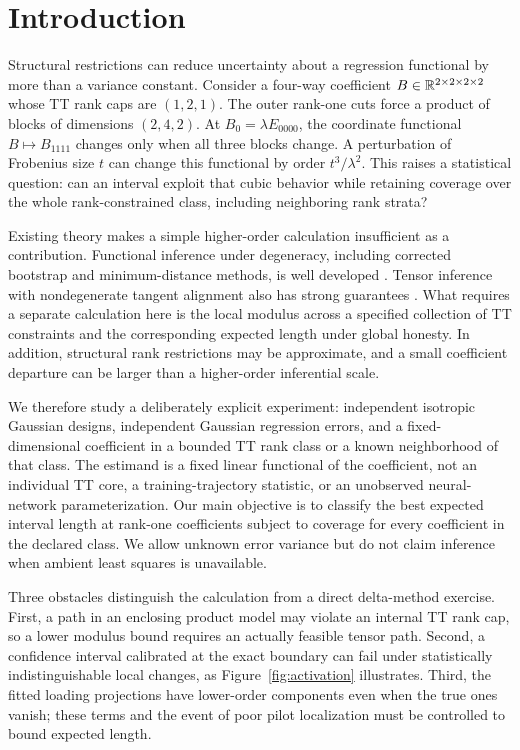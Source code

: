 \section{Introduction}
Structural restrictions can reduce uncertainty about a regression functional by more than a variance constant. Consider a four-way coefficient $B\in\mathbb R^{2\times2\times2\times2}$ whose TT rank caps are $(1,2,1)$. The outer rank-one cuts force a product of blocks of dimensions $(2,4,2)$. At $B_0=\lambda E_{0000}$, the coordinate functional $B\mapsto B_{1111}$ changes only when all three blocks change. A perturbation of Frobenius size $t$ can change this functional by order $t^3/\lambda^2$. This raises a statistical question: can an interval exploit that cubic behavior while retaining coverage over the whole rank-constrained class, including neighboring rank strata?

Existing theory makes a simple higher-order calculation insufficient as a contribution. Functional inference under degeneracy, including corrected bootstrap and minimum-distance methods, is well developed \citep{chenfang2019,bei2026}. Tensor inference with nondegenerate tangent alignment also has strong guarantees \citep{xu2025,maxia2024}. What requires a separate calculation here is the local modulus across a specified collection of TT constraints and the corresponding expected length under global honesty. In addition, structural rank restrictions may be approximate, and a small coefficient departure can be larger than a higher-order inferential scale.

We therefore study a deliberately explicit experiment: independent isotropic Gaussian designs, independent Gaussian regression errors, and a fixed-dimensional coefficient in a bounded TT rank class or a known neighborhood of that class. The estimand is a fixed linear functional of the coefficient, not an individual TT core, a training-trajectory statistic, or an unobserved neural-network parameterization. Our main objective is to classify the best expected interval length at rank-one coefficients subject to coverage for every coefficient in the declared class. We allow unknown error variance but do not claim inference when ambient least squares is unavailable.

Three obstacles distinguish the calculation from a direct delta-method exercise. First, a path in an enclosing product model may violate an internal TT rank cap, so a lower modulus bound requires an actually feasible tensor path. Second, a confidence interval calibrated at the exact boundary can fail under statistically indistinguishable local changes, as Figure~\ref{fig:activation} illustrates. Third, the fitted loading projections have lower-order components even when the true ones vanish; these terms and the event of poor pilot localization must be controlled to bound expected length.

